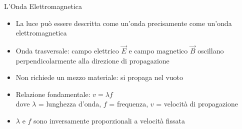 \begin{frame}{L'Onda Elettromagnetica}
    \begin{itemize}
        \item La luce può essere descritta come un'onda precisamente come un'onda elettromagnetica
        \item Onda trasversale: campo elettrico $\vec{E}$ e campo magnetico $\vec{B}$ oscillano perpendicolarmente alla direzione di propagazione
        \item Non richiede un mezzo materiale: si propaga nel vuoto
        \item Relazione fondamentale: 
        $v = \lambda f$ \\
        dove $\lambda$ = lunghezza d'onda, $f$ = frequenza, $v$ = velocità di propagazione
        \item $\lambda$ e $f$ sono inversamente proporzionali a velocità fissata
    \end{itemize}
\end{frame}




